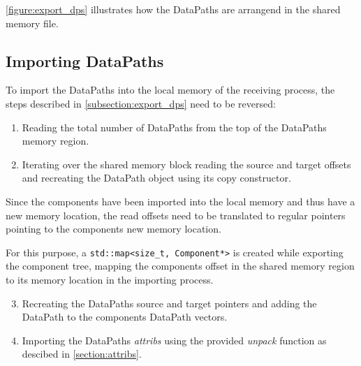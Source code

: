 \autoref{figure:export_dps} illustrates how the DataPaths are arrangend in the shared memory file.

\subsection{Importing DataPaths}
To import the DataPaths into the local memory of the receiving process, the steps described in \autoref{subsection:export_dps} need to be reversed:

\begin{enumerate}
    \item Reading the total number of DataPaths from the top of the DataPaths memory region.
    \item Iterating over the shared memory block reading the source and target offsets and recreating the DataPath object using its copy constructor.
\end{enumerate}

Since the components have been imported into the local memory and thus have a new memory location, the read offsets need to be translated to regular pointers
pointing to the components new memory location.

For this purpose, a \lstinline|std::map<size_t, Component*>| is created while exporting the component tree, mapping the components offset in the shared memory region to its
memory location in the importing process.

\begin{enumerate}
    \setcounter{enumi}{2}
    \item Recreating the DataPaths source and target pointers and adding the DataPath to the components DataPath vectors.
    \item Importing the DataPaths \emph{attribs} using the provided \emph{unpack} function as descibed in \autoref{section:attribs}.
\end{enumerate}